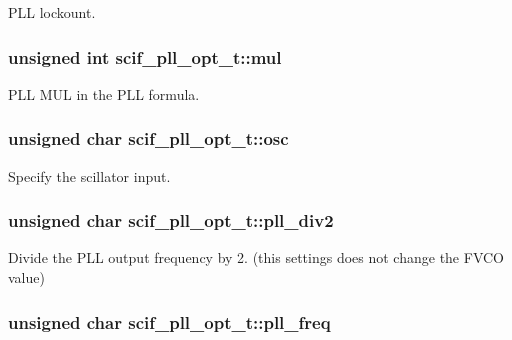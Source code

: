 \-P\-L\-L lockount. 

\hypertarget{structscif__pll__opt__t_aae5047440f34de93ea589e39e4ce94da}{
\subsubsection[{mul}]{\setlength{\rightskip}{0pt plus 5cm}unsigned int {\bf scif\-\_\-pll\-\_\-opt\-\_\-t\-::mul}}}
\label{structscif__pll__opt__t_aae5047440f34de93ea589e39e4ce94da}


\-P\-L\-L \-M\-U\-L in the \-P\-L\-L formula. 

\hypertarget{structscif__pll__opt__t_aee09a41840d5059cbb116689ea851d0f}{
\subsubsection[{osc}]{\setlength{\rightskip}{0pt plus 5cm}unsigned char {\bf scif\-\_\-pll\-\_\-opt\-\_\-t\-::osc}}}
\label{structscif__pll__opt__t_aee09a41840d5059cbb116689ea851d0f}


\-Specify the scillator input. 

\hypertarget{structscif__pll__opt__t_af1afe250ff51e752c3edf06da9f25aad}{
\subsubsection[{pll\-\_\-div2}]{\setlength{\rightskip}{0pt plus 5cm}unsigned char {\bf scif\-\_\-pll\-\_\-opt\-\_\-t\-::pll\-\_\-div2}}}
\label{structscif__pll__opt__t_af1afe250ff51e752c3edf06da9f25aad}


\-Divide the \-P\-L\-L output frequency by 2. (this settings does not change the \-F\-V\-C\-O value) 

\hypertarget{structscif__pll__opt__t_ae397f441f9093a691a6e74fa777dd939}{
\subsubsection[{pll\-\_\-freq}]{\setlength{\rightskip}{0pt plus 5cm}unsigned char {\bf scif\-\_\-pll\-\_\-opt\-\_\-t\-::pll\-\_\-freq}}}
\label{structscif__pll__opt__t_ae397f441f9093a691a6e74fa777dd939}



